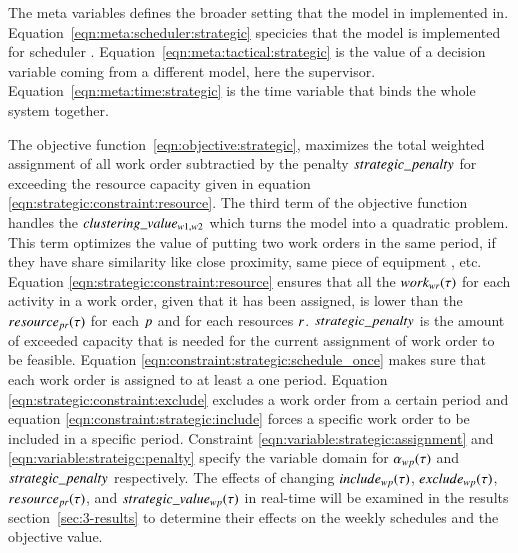 
\strategicmodel[clustering=false]

The meta variables defines the broader setting that the model in implemented in.
Equation~\eqref{eqn:meta:scheduler:strategic} specicies that the model is
implemented for scheduler \ElementScheduler. Equation~\eqref{eqn:meta:tactical:strategic} is the value
of a decision variable coming from a different model, here the supervisor.
Equation~\eqref{eqn:meta:time:strategic} is the time variable that binds the whole
system together.

The objective function~\eqref{eqn:objective:strategic},  maximizes the total
weighted assignment of all work order subtractied by the penalty $strategic\_penalty$
for exceeding the resource capacity given in equation
\eqref{eqn:strategic:constraint:resource}. The third term of the objective
function handles the $clustering\_value_{w1, w2}$ which turns the model into a quadratic
problem. This term optimizes the value of putting two work orders in the same
period, if they have share similarity like close proximity, same piece of equipment
, etc.  Equation \eqref{eqn:strategic:constraint:resource} ensures
that all the $work_{wr}(\tau)$ for each activity in a work
order, given that it has been assigned, is lower than the $\ParStrategicResource$ for each
$p$ and for each resources $r$. $strategic\_penalty$ is the
amount of exceeded capacity that is needed for the current assignment of work
order to be feasible. Equation \eqref{eqn:constraint:strategic:schedule_once}
makes sure that each work order is assigned to at least a one
period. Equation \eqref{eqn:strategic:constraint:exclude}
excludes a work order from a certain period and equation
\eqref{eqn:constraint:strategic:include} forces a specific work order to be
included in a specific period. Constraint \eqref{eqn:variable:strategic:assignment}
and \eqref{eqn:variable:strateigc:penalty} specify the variable domain
for $\alpha_{wp}(\tau)$
and $strategic\_penalty$ respectively. The effects of changing $
	include_{wp}(\tau)$, $exclude_{wp}(\tau)$, $\ParStrategicResource$, and $
	strategic\_value_{w p}(\tau)$ in real-time will be examined in the results section~\ref{sec:3-results} to
determine their effects on the weekly schedules and the objective value.
